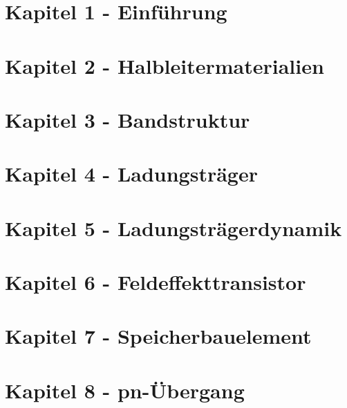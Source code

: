 



	\createtitle
		
	\section{Kapitel 1 - Einführung}
	
	
	\section{Kapitel 2 - Halbleitermaterialien}
	
	
	\section{Kapitel 3 - Bandstruktur }
	
	
	\section{Kapitel 4 - Ladungsträger }
	
	
	\section{Kapitel 5 - Ladungsträgerdynamik }
	
	
	\section{Kapitel 6 - Feldeffekttransistor }
	
	
	\section{Kapitel 7 - Speicherbauelement }
	
	
	\section{Kapitel 8 - pn-Übergang }
	
	
